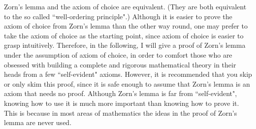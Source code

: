 \documentclass[12pt,b5paper,notitlepage]{article}
\theoremstyle{definition}
\theoremstyle{plain}
\numberwithin{equation}{section}
\begin{document}
Zorn's lemma and the axiom of choice are equivalent. (They are both equivalent to the so called ``well-ordering principle".) Although it is easier to prove the axiom of choice from Zorn's lemma than the other way round, one may prefer to take the axiom of choice as the starting point, since axiom of choice is easier to grasp intuitively. Therefore, in the following, I will give a proof of Zorn's lemma under the assumption of axiom of choice, in order to comfort those who are obsessed with building a complete and rigorous mathematical theory in their heads from a few ``self-evident" axioms. However, it is recommended that you skip or only skim this proof, since it is safe enough to assume that Zorn's lemma is an axiom that needs no proof. Although Zorn's lemma is far from ``self-evident", knowing how to use it is much more important than knowing how to prove it. This is because in most areas of mathematics the ideas in the proof of Zorn's lemma are never used.
\end{document}
